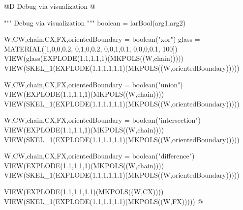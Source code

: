 \documentclass[11pt,oneside]{article}	%
\begin{document}
	
@D Debug via visualization
@{""" Debug via visualization """
boolean = larBool(arg1,arg2)	

W,CW,chain,CX,FX,orientedBoundary = boolean("xor")
glass = MATERIAL([1,0,0,0.2,  0,1,0,0.2,  0,0,1,0.1, 0,0,0,0.1, 100])
VIEW(glass(EXPLODE(1.1,1.1,1)(MKPOLS((W,chain)))))
VIEW(SKEL_1(EXPLODE(1.1,1.1,1.1)(MKPOLS((W,orientedBoundary)))))

W,CW,chain,CX,FX,orientedBoundary = boolean("union")
VIEW(EXPLODE(1.1,1.1,1)(MKPOLS((W,chain))))
VIEW(SKEL_1(EXPLODE(1.1,1.1,1.1)(MKPOLS((W,orientedBoundary)))))

W,CW,chain,CX,FX,orientedBoundary = boolean("intersection")
VIEW(EXPLODE(1.1,1.1,1)(MKPOLS((W,chain))))
VIEW(SKEL_1(EXPLODE(1.1,1.1,1.1)(MKPOLS((W,orientedBoundary)))))

W,CW,chain,CX,FX,orientedBoundary = boolean("difference")
VIEW(EXPLODE(1.1,1.1,1)(MKPOLS((W,chain))))
VIEW(SKEL_1(EXPLODE(1.1,1.1,1.1)(MKPOLS((W,orientedBoundary)))))

VIEW(EXPLODE(1.1,1.1,1.1)(MKPOLS((W,CX))))
VIEW(SKEL_1(EXPLODE(1.1,1.1,1.1)(MKPOLS((W,FX)))))
@}
\end{document}
